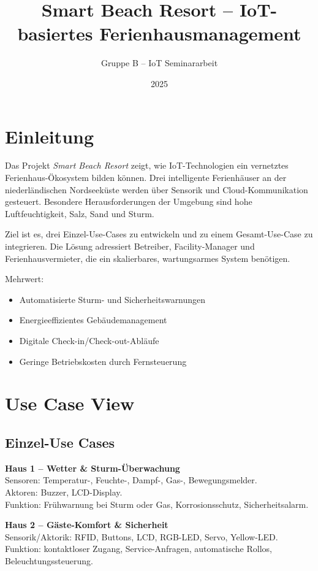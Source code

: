 \documentclass[12pt,a4paper]{article}
\title{Smart Beach Resort – IoT-basiertes Ferienhausmanagement}
\author{Gruppe B -- IoT Seminararbeit}
\date{2025}
\begin{document}
\maketitle
\tableofcontents
\newpage

\section{Einleitung}
Das Projekt \textit{Smart Beach Resort} zeigt, wie IoT-Technologien ein vernetztes Ferienhaus-Ökosystem bilden können.
Drei intelligente Ferienhäuser an der niederländischen Nordseeküste werden über Sensorik und Cloud-Kommunikation gesteuert.
Besondere Herausforderungen der Umgebung sind hohe Luftfeuchtigkeit, Salz, Sand und Sturm.

Ziel ist es, drei Einzel-Use-Cases zu entwickeln und zu einem Gesamt-Use-Case zu integrieren.
Die Lösung adressiert Betreiber, Facility-Manager und Ferienhausvermieter, die ein skalierbares, wartungsarmes System benötigen.

Mehrwert:
\begin{itemize}[noitemsep]
  \item Automatisierte Sturm- und Sicherheitswarnungen
  \item Energieeffizientes Gebäudemanagement
  \item Digitale Check-in/Check-out-Abläufe
  \item Geringe Betriebskosten durch Fernsteuerung
\end{itemize}

\newpage
\section{Use Case View}

\subsection{Einzel-Use Cases}
\textbf{Haus 1 – Wetter \& Sturm-Überwachung}\\
Sensoren: Temperatur-, Feuchte-, Dampf-, Gas-, Bewegungsmelder.\\
Aktoren: Buzzer, LCD-Display.\\
Funktion: Frühwarnung bei Sturm oder Gas, Korrosionsschutz, Sicherheitsalarm.

\vspace{0.5em}
\textbf{Haus 2 – Gäste-Komfort \& Sicherheit}\\
Sensorik/Aktorik: RFID, Buttons, LCD, RGB-LED, Servo, Yellow-LED.\\
Funktion: kontaktloser Zugang, Service-Anfragen, automatische Rollos, Beleuchtungssteuerung.
\end{document}
